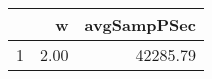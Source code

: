 \begin{table}[h]
\centering
\begin{tabular}{rrr}
  \hline
 & w & avgSampPSec \\ 
  \hline
1 & 2.00 & 42285.79 \\ 
   \hline
\end{tabular}
\end{table}
